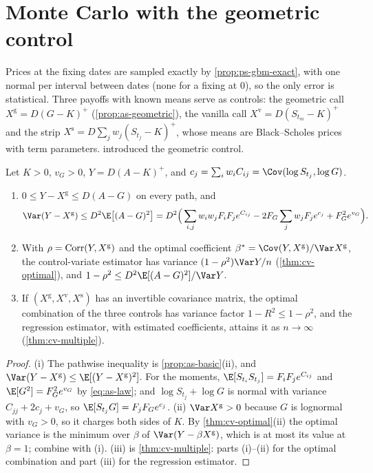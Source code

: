 \section{Monte Carlo with the geometric control}\label{sec:as-mc}

Prices at the fixing dates are sampled exactly by \cref{prop:ps-gbm-exact}, with one normal
per interval between dates (none for a fixing at $0$), so the only error is statistical.
Three payoffs with known means serve as controls: the geometric call
$X^{\mathrm g}=D(G-K)^+$ (\cref{prop:as-geometric}), the vanilla call
$X^{\mathrm v}=D(S_{t_m}-K)^+$ and the strip $X^{\mathrm s}=D\sum_jw_j(S_{t_j}-K)^+$, whose
means are Black--Scholes prices with term parameters. \textcite{kemna-vorst} introduced the
geometric control.

\begin{proposition}\label{prop:as-control}
Let $K>0$, $v_G>0$, $Y=D(A-K)^+$, and $c_j=\sum_iw_iC_{ij}=\Cov(\log S_{t_j},\log G)$.
\begin{enumerate}[label=(\roman*)]
  \item $0\le Y-X^{\mathrm g}\le D(A-G)$ on every path, and
    \[
      \Var(Y-X^{\mathrm g})\le D^2\E\big[(A-G)^2\big]
      =D^2\Big(\sum_{i,j}w_iw_jF_iF_je^{C_{ij}}-2F_G\sum_jw_jF_je^{c_j}+F_G^2e^{v_G}\Big).
    \]
  \item With $\rho=\operatorname{Corr}(Y,X^{\mathrm g})$ and the optimal coefficient
    $\beta^*=\Cov(Y,X^{\mathrm g})/\Var X^{\mathrm g}$, the control-variate estimator has variance
    $(1-\rho^2)\Var Y/n$ (\cref{thm:cv-optimal}), and
    $1-\rho^2\le D^2\E[(A-G)^2]/\Var Y$.
  \item If $(X^{\mathrm g},X^{\mathrm v},X^{\mathrm s})$ has an invertible covariance matrix,
    the optimal combination of the three controls has variance factor $1-R^2\le1-\rho^2$, and
    the regression estimator, with estimated coefficients, attains it as $n\to\infty$
    (\cref{thm:cv-multiple}).
\end{enumerate}
\end{proposition}

\begin{proof}
(i) The pathwise inequality is \cref{prop:as-basic}(ii), and
$\Var(Y-X^{\mathrm g})\le\E[(Y-X^{\mathrm g})^2]$. For the moments, $\E[S_{t_i}S_{t_j}]=F_iF_je^{C_{ij}}$
and $\E[G^2]=F_G^2e^{v_G}$ by \eqref{eq:as-law}; and $\log S_{t_j}+\log G$ is normal with
variance $C_{jj}+2c_j+v_G$, so $\E[S_{t_j}G]=F_jF_Ge^{c_j}$. (ii) $\Var X^{\mathrm g}>0$
because $G$ is lognormal with $v_G>0$, so it charges both sides of $K$. By
\cref{thm:cv-optimal}(ii) the optimal variance is the minimum over $\beta$ of
$\Var(Y-\beta X^{\mathrm g})$, which is at most its value at $\beta=1$; combine with (i).
(iii) is \cref{thm:cv-multiple}: parts (i)--(ii) for the optimal combination and part (iii) for
the regression estimator.
\end{proof}

